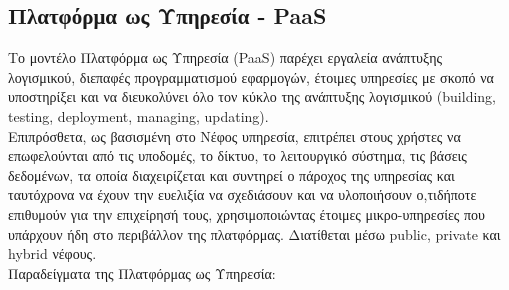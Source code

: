 \documentclass{article}
\begin{document}
\subsection{Πλατφόρμα ως Υπηρεσία - PaaS}
Το μοντέλο Πλατφόρμα ως Υπηρεσία (PaaS) παρέχει εργαλεία ανάπτυξης λογισμικού, διεπαφές προγραμματισμού εφαρμογών, έτοιμες υπηρεσίες με σκοπό να υποστηρίξει και να διευκολύνει όλο τον κύκλο της ανάπτυξης λογισμικού (building, testing, deployment, managing, updating). \\
Επιπρόσθετα, ως βασισμένη στο Νέφος υπηρεσία, επιτρέπει στους χρήστες να επωφελούνται από τις υποδομές, το δίκτυο, το λειτουργικό σύστημα, τις βάσεις δεδομένων, τα οποία διαχειρίζεται και συντηρεί ο πάροχος της υπηρεσίας και ταυτόχρονα να έχουν την ευελιξία να σχεδιάσουν και να υλοποιήσουν ο,τιδήποτε επιθυμούν για την επιχείρησή τους, χρησιμοποιώντας έτοιμες μικρο-υπηρεσίες που υπάρχουν ήδη στο περιβάλλον της πλατφόρμας. Διατίθεται μέσω  public, private και hybrid νέφους. \\
Παραδείγματα της Πλατφόρμας ως Υπηρεσία:
\end{document}
